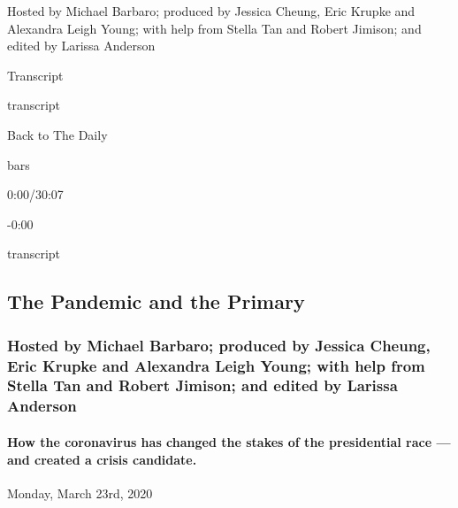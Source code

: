 Hosted by Michael Barbaro; produced by Jessica Cheung, Eric Krupke and
Alexandra Leigh Young; with help from Stella Tan and Robert Jimison; and
edited by Larissa Anderson

Transcript

transcript

Back to The Daily

bars

0:00/30:07

-0:00

transcript

\hypertarget{the-pandemic-and-the-primary-2}{%
\subsection{The Pandemic and the
Primary}\label{the-pandemic-and-the-primary-2}}

\hypertarget{hosted-by-michael-barbaro-produced-by-jessica-cheung-eric-krupke-and-alexandra-leigh-young-with-help-from-stella-tan-and-robert-jimison-and-edited-by-larissa-anderson-1}{%
\subsubsection{Hosted by Michael Barbaro; produced by Jessica Cheung,
Eric Krupke and Alexandra Leigh Young; with help from Stella Tan and
Robert Jimison; and edited by Larissa
Anderson}\label{hosted-by-michael-barbaro-produced-by-jessica-cheung-eric-krupke-and-alexandra-leigh-young-with-help-from-stella-tan-and-robert-jimison-and-edited-by-larissa-anderson-1}}

\hypertarget{how-the-coronavirus-has-changed-the-stakes-of-the-presidential-race--and-created-a-crisis-candidate-2}{%
\paragraph{How the coronavirus has changed the stakes of the
presidential race --- and created a crisis
candidate.}\label{how-the-coronavirus-has-changed-the-stakes-of-the-presidential-race--and-created-a-crisis-candidate-2}}

Monday, March 23rd, 2020

